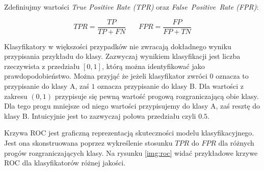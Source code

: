 \documentclass[a4paper, twoside, 11pt, openright]{article}
\begin{document}
\bigskip

Zdefiniujmy wartości \textit{True Positive Rate (TPR)} oraz \textit{False\ Positive\ Rate (FPR)}:

$$ TPR = \frac{TP}{TP+FN}\ \ \ \ \ \ \ \ FPR = \frac{FP}{FP+TN} $$

Klasyfikatory w większości przypadków nie zwracają dokładnego wyniku przypisania przykładu do klasy. Zazwyczaj wynikiem klasyfikacji jest liczba rzeczywista z przedziału $[0, 1]$, którą można identyfikować jako prawdopodobieństwo. Można przyjąć że jeżeli klasyfikator zwróci $0$ oznacza to przypisanie do klasy A, zaś $1$ oznacza przypisanie do klasy B. Dla wartości z zakresu $(0, 1)$ przypisuje się pewną wartość progową rozgraniczającą obie klasy. Dla tego progu mniejsze od niego wartości przypisujemy do klasy A, zaś resztę do klasy B. Intuicyjnie jest to zazwyczaj połowa przedziału czyli $0.5$.

Krzywa ROC jest graficzną reprezentacją skuteczności modelu klasyfikacyjnego. Jest ona skonstruowana poprzez wykreślenie stosunku $TPR$ do $FPR$ dla różnych progów rozgraniczających klasy. Na rysunku \ref{img:roc} widać przykładowe krzywe ROC dla klasyfikatorów różnej jakości.
\end{document}
